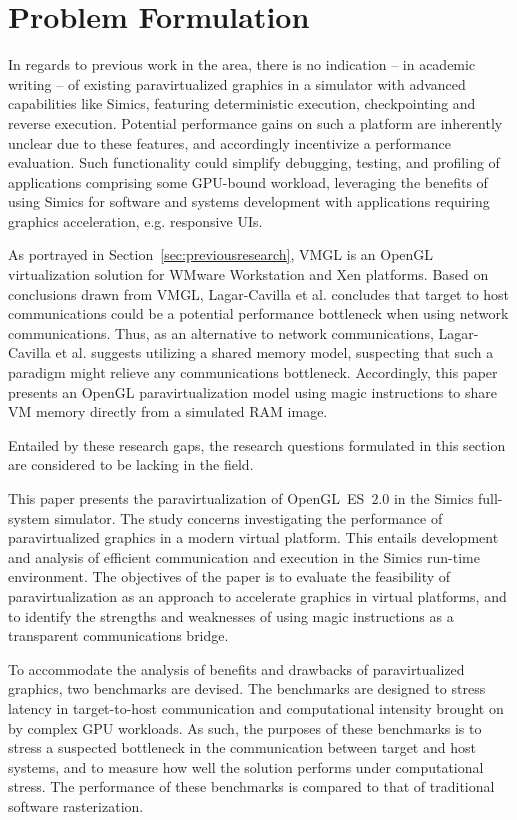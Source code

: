 
\section{Problem Formulation}
\label{sec:problemformulation}
In regards to previous work in the area, there is no indication -- in academic writing -- of existing paravirtualized graphics in a simulator with advanced capabilities like Simics, featuring deterministic execution, checkpointing and reverse execution.
Potential performance gains on such a platform are inherently unclear due to these features, and accordingly incentivize a performance evaluation.
Such functionality could simplify debugging, testing, and profiling of applications comprising some GPU-bound workload, leveraging the benefits of using Simics for software and systems development with applications requiring graphics acceleration, e.g. responsive UIs.

As portrayed in Section~\ref{sec:previousresearch}, VMGL is an OpenGL virtualization solution for WMware Workstation and Xen platforms.
Based on conclusions drawn from VMGL, Lagar-Cavilla et al. concludes that target to host communications could be a potential performance bottleneck when using network communications.
Thus, as an alternative to network communications, Lagar-Cavilla et al. suggests utilizing a shared memory model, suspecting that such a paradigm might relieve any communications bottleneck.
Accordingly, this paper presents an OpenGL paravirtualization model using magic instructions to share VM memory directly from a simulated RAM image.

Entailed by these research gaps, the research questions formulated in this section are considered to be lacking in the field.

This paper presents the paravirtualization of OpenGL~ES~$2.0$ in the Simics full-system simulator. 
The study concerns investigating the performance of paravirtualized graphics in a modern virtual platform.
This entails development and analysis of efficient communication and execution in the Simics run-time environment.
The objectives of the paper is to evaluate the feasibility of paravirtualization as an approach to accelerate graphics in virtual platforms, and to identify the strengths and weaknesses of using magic instructions as a transparent communications bridge.

To accommodate the analysis of benefits and drawbacks of paravirtualized graphics, two benchmarks are devised.
The benchmarks are designed to stress latency in target-to-host communication and computational intensity brought on by complex GPU workloads.
As such, the purposes of these benchmarks is to stress a suspected bottleneck in the communication between target and host systems, and to measure how well the solution performs under computational stress.
The performance of these benchmarks is compared to that of traditional software rasterization.

